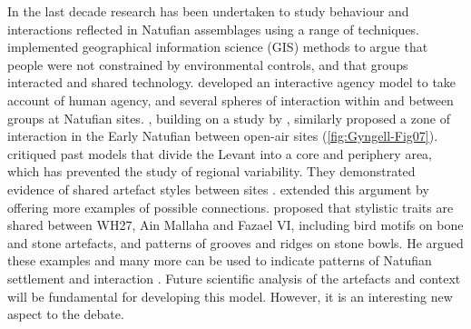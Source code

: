 In the last decade research has been undertaken to study behaviour and interactions reflected in Natufian assemblages using a range of techniques. \textcite{Parslow_2009} implemented geographical information science (GIS) methods to argue that people were not constrained by environmental controls, and that groups interacted and shared technology. 
\textcite[3]{Parslow_2009} developed an interactive agency model to take account of human agency, and several spheres of interaction within and between groups at Natufian sites. 
\textcite{Edwards_2015}, building on a study by \textcite{Belfer-Cohen_2013}, similarly proposed a zone of interaction in the Early Natufian between open-air sites (\cref{fig:Gyngell-Fig07}). 
\textcite[547]{Belfer-Cohen_2013} critiqued past models that divide the Levant into a core and periphery area, which has prevented the study of regional variability. 
They demonstrated evidence of shared artefact styles between sites \textcite[546]{Belfer-Cohen_2013}. 
\textcite[272]{Edwards_2015} extended this argument by offering more examples of possible connections. 
\textcite[276]{Edwards_2015} proposed that stylistic traits are shared between WH27, Ain Mallaha and Fazael VI, including bird motifs on bone and stone artefacts, and patterns of grooves and ridges on stone bowls. 
He argued these examples and many more can be used to indicate patterns of Natufian settlement and interaction \parencite[280]{Edwards_2015}. Future scientific analysis of the artefacts and context will be fundamental for developing this model. However, it is an interesting new aspect to the debate.

